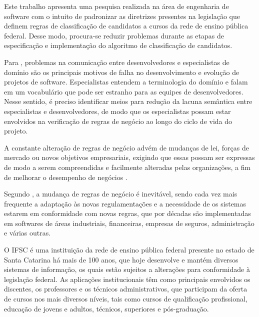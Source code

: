 
 Este trabalho apresenta uma pesquisa realizada na área de engenharia de software com o intuito de padronizar as diretrizes presentes na legislação que definem regras de classificação de candidatos a cursos da rede de ensino pública federal. Desse modo, procura-se reduzir problemas durante as etapas de especificação e implementação do algoritmo de classificação de candidatos.
 
 Para , problemas na comunicação entre desenvolvedores e especialistas de domínio são os principais motivos de falha no desenvolvimento e evolução de projetos de software. Especialistas entendem a terminologia do domínio e falam em um vocabulário que pode ser estranho para as equipes de desenvolvedores. Nesse sentido, é preciso identificar meios para redução da lacuna semântica entre especialistas e desenvolvedores, de modo que os especialistas possam estar envolvidos na verificação de regras de negócio ao longo do ciclo de vida do projeto.

 A constante alteração de regras de negócio advém de mudanças de lei, forças de mercado ou novos objetivos empresariais, exigindo que essas possam ser expressas de modo a serem compreendidas e facilmente alteradas pelas organizações, a fim de melhorar o desempenho de negócios \cite{flexiblerules}.
 
 Segundo , a mudança de regras de negócio é inevitável, sendo cada vez mais frequente a adaptação às novas regulamentações e a necessidade de os sistemas estarem em conformidade com novas regras, que por décadas são implementadas em softwares de áreas industriais, financeiras, empresas de seguros, administração e várias outras.
 
 O \gls{IFSC} é uma instituição da rede de ensino pública federal presente no estado de Santa Catarina há mais de 100 anos, que hoje desenvolve e mantém diversos sistemas de informação, os quais estão sujeitos a alterações para conformidade à legislação federal. As aplicações institucionais têm como principais envolvidos os discentes, os professores e os técnicos administrativos, que participam da oferta de cursos nos mais diversos níveis, tais como cursos de qualificação profissional, educação de jovens e adultos, técnicos, superiores e pós-graduação. 
 
